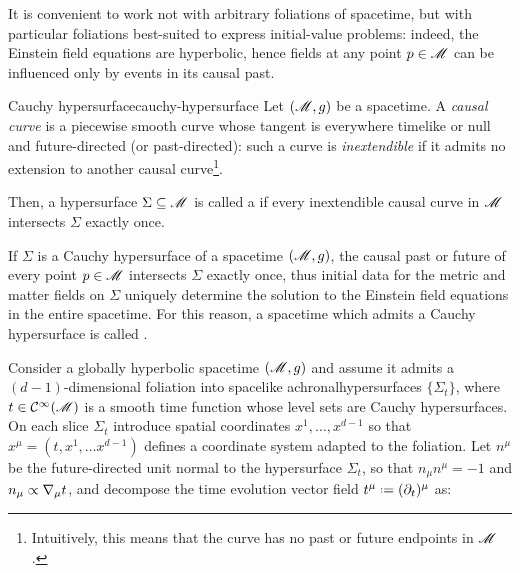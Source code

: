 It is convenient to work not with arbitrary foliations of spacetime, but with particular foliations best-suited to express initial-value problems: indeed, the Einstein field equations are hyperbolic, hence fields at any point $ p \in \mathscr{M} $ can be influenced only by events in its causal past.

\begin{definition}{Cauchy hypersurface}{cauchy-hypersurface}
  Let $ (\mathscr{M} , g) $ be a spacetime. A \emph{causal curve} is a piecewise smooth curve whose tangent is everywhere timelike or null and future-directed (or past-directed): such a curve is \emph{inextendible} if it admits no extension to another causal curve\footnote{Intuitively, this means that the curve has no past or future endpoints in $ \mathscr{M} $.}.

  Then, a hypersurface $ \Sigma \subseteq \mathscr{M} $ is called a  if every inextendible causal curve in $ \mathscr{M} $ intersects $ \Sigma $ exactly once.
\end{definition}

If $ \Sigma $ is a Cauchy hypersurface of a spacetime $ (\mathscr{M} , g) $, the causal past or future of every point $ p \in \mathscr{M} $ intersects $ \Sigma $ exactly once, thus initial data for the metric and matter fields on $ \Sigma $ uniquely determine the solution to the Einstein field equations in the entire spacetime. For this reason, a spacetime which admits a Cauchy hypersurface is called .

Consider a globally hyperbolic spacetime $ (\mathscr{M} , g) $ and assume it admits a $ (d-1) $-dimensional foliation into spacelike achronal\footnotemark hypersurfaces $ \{\Sigma_t\} $, where $ t \in \mathcal{C}^{\infty}(\mathscr{M}) $ is a smooth time function whose level sets are Cauchy hypersurfaces. On each slice $ \Sigma_t $ introduce spatial coordinates $ x^1 , \dots , x^{d-1} $ so that $ x^\mu = (t , x^1 , \dots x^{d-1}) $ defines a coordinate system adapted to the foliation. Let $ n^\mu $ be the future-directed unit normal to the hypersurface $ \Sigma_t $, so that $ n_\mu n^\mu = -1 $ and $ n_\mu \propto \nabla_\mu t $, and decompose the time evolution vector field $ t^\mu \defeq (\pa_t)^\mu $ as:


